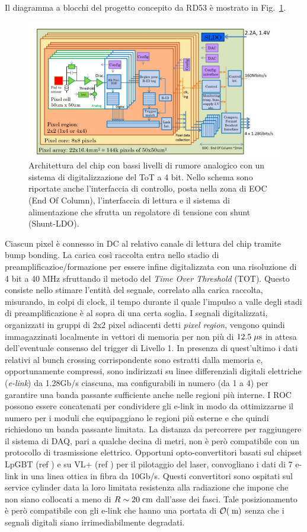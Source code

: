 Il diagramma a blocchi del progetto concepito da RD53 è mostrato in Fig.~\ref{ChipBlockDiagram}. 
\begin{figure}
\centering
\includegraphics[scale=0.4]{Immagini/ChipBlockDiagram}
\caption{Architettura del chip con bassi livelli di rumore analogico con un sistema di digitalizzazione del ToT a 4 bit. Nello schema sono riportate anche l'interfaccia di controllo, posta nella zona di EOC (End Of Column), l'interfaccia di lettura e il sistema di alimentazione che sfrutta un regolatore di tensione con shunt (Shunt-LDO).}
\label{ChipBlockDiagram}
\end{figure}
Ciascun pixel \`e connesso in DC al relativo canale di lettura del chip tramite bump bonding. La carica cos\`i raccolta entra nello stadio di preamplificazioe/formazione per essere infine digitalizzata con una risoluzione di 4 bit a 40 MHz sfruttando il metodo del {\em Time Over Threshold} (TOT). Questo consiste nello stimare l'entit\`a del segnale, correlato alla carica raccolta, misurando, in colpi di clock, il tempo durante il quale l'impulso a valle degli stadi di preamplificazione è al sopra di una certa soglia. I segnali digitalizzati, organizzati in gruppi di 2x2 pixel adiacenti detti {\em pixel region}, vengono quindi immagazzinati localmente in vettori di memoria per non pi\`u di $12.5\; \mu \rm s$ in attesa dell'eventuale consenso del trigger di Livello 1. In presenza di quest'ultimo i dati relativi al bunch crossing corrispondente sono estratti dalla memoria e, opportunamente compressi, sono indirizzati su linee differenziali digitali elettriche ({\em e-link}) da 1.28Gb/s ciascuna, ma configurabili in numero (da 1 a 4) per garantire una banda passante sufficiente anche nelle regioni pi\`u interne. I ROC possono essere concatenati per condividere gli e-link in modo da ottimizzarne il numero per i moduli che equipaggiano le regioni pi\`u esterne e che quindi richiedono un banda passante limitata. La distanza da percorrere per raggiungere il sistema di DAQ, pari a qualche decina di metri, non \`e per\`o compatibile con un protocollo di trasmissione elettrico. Opportuni opto-convertitori basati sul chipset LpGBT (ref ) e su VL+ (ref ) per il pilotaggio del laser, convogliano i dati di 7 e-link in una linea ottica in fibra da 10Gb/s. Questi convertitori sono ospitati sul service cylinder data la loro limitata resistenza alla radiazione che impone che non siano collocati a meno di $R\sim20\rm \; cm$ dall'asse dei fasci. Tale posizionamento \`e per\`o compatibile con gli e-link che hanno una portata di ${\cal O}(\rm \; m)$ senza che i segnali digitali siano irrimediabilmente degradati.
